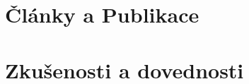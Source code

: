 \documentclass[a4paper,12pt]{article}
\begin{document}
\section{Články a Publikace}
\begin{refsection}
\nocite{*}
\printbibliography[heading=none]
\end{refsection}


\section{Zkušenosti a dovednosti}
\end{document}
